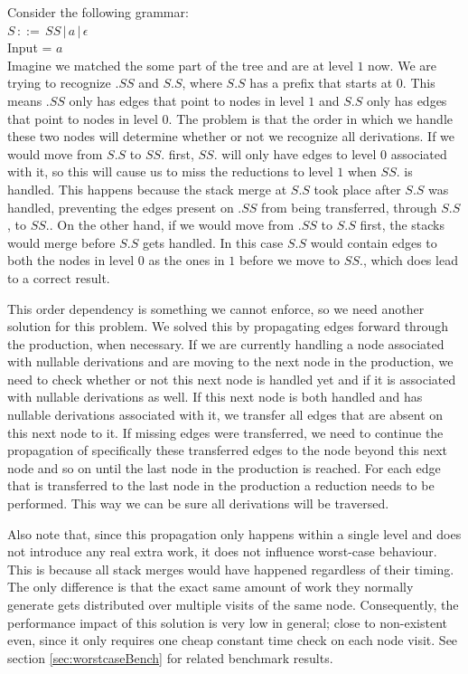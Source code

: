 \documentclass[a4paper,10pt]{article}
\begin{document}
Consider the following grammar:\\
$S\,::=\,SS\,|\,a\,|\,\epsilon$\\
Input = $a$\\
Imagine we matched the some part of the tree and are at level $1$ now. We are trying to recognize $.SS$ and $S.S$, where $S.S$ has a prefix that starts at $0$. This means $.SS$ only has edges that point to nodes in level $1$ and $S.S$ only has edges that point to nodes in level $0$. The problem is that the order in which we handle these two nodes will determine whether or not we recognize all derivations. If we would move from $S.S$ to $SS.$ first, $SS.$ will only have edges to level $0$ associated with it, so this will cause us to miss the reductions to level $1$ when $SS.$ is handled. This happens because the stack merge at $S.S$ took place after $S.S$ was handled, preventing the edges present on $.SS$ from being transferred, through $S.S$, to $SS.$. On the other hand, if we would move from $.SS$ to $S.S$ first, the stacks would merge before $S.S$ gets handled. In this case $S.S$ would contain edges to both the nodes in level $0$ as the ones in $1$ before we move to $SS.$, which does lead to a correct result.

This order dependency is something we cannot enforce, so we need another solution for this problem. We solved this by propagating edges forward through the production, when necessary. If we are currently handling a node associated with nullable derivations and are moving to the next node in the production, we need to check whether or not this next node is handled yet and if it is associated with nullable derivations as well. If this next node is both handled and has nullable derivations associated with it, we transfer all edges that are absent on this next node to it. If missing edges were transferred, we need to continue the propagation of specifically these transferred edges to the node beyond this next node and so on until the last node in the production is reached. For each edge that is transferred to the last node in the production a reduction needs to be performed. This way we can be sure all derivations will be traversed.

Also note that, since this propagation only happens within a single level and does not introduce any real extra work, it does not influence worst-case behaviour. This is because all stack merges would have happened regardless of their timing. The only difference is that the exact same amount of work they normally generate gets distributed over multiple visits of the same node. Consequently, the performance impact of this solution is very low in general; close to non-existent even, since it only requires one cheap constant time check on each node visit. See section \ref{sec:worstcaseBench} for related benchmark results.
\end{document}
